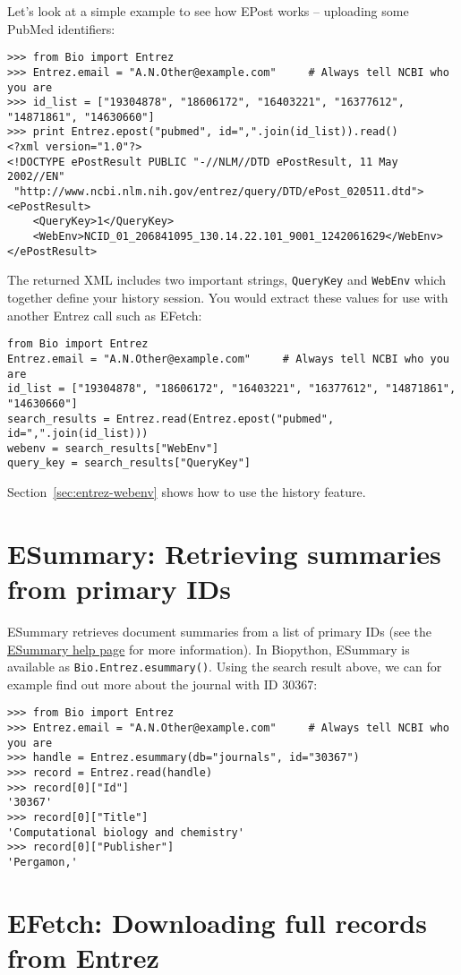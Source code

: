 \documentclass{report}
\begin{document}
Let's look at a simple example to see how EPost works -- uploading some PubMed identifiers:
\begin{verbatim}
>>> from Bio import Entrez
>>> Entrez.email = "A.N.Other@example.com"     # Always tell NCBI who you are
>>> id_list = ["19304878", "18606172", "16403221", "16377612", "14871861", "14630660"]
>>> print Entrez.epost("pubmed", id=",".join(id_list)).read()
<?xml version="1.0"?>
<!DOCTYPE ePostResult PUBLIC "-//NLM//DTD ePostResult, 11 May 2002//EN"
 "http://www.ncbi.nlm.nih.gov/entrez/query/DTD/ePost_020511.dtd">
<ePostResult>
	<QueryKey>1</QueryKey>
	<WebEnv>NCID_01_206841095_130.14.22.101_9001_1242061629</WebEnv>
</ePostResult>
\end{verbatim}
\noindent The returned XML includes two important strings, \verb|QueryKey| and \verb|WebEnv| which together define your history session.
You would extract these values for use with another Entrez call such as EFetch:
\begin{verbatim}
from Bio import Entrez
Entrez.email = "A.N.Other@example.com"     # Always tell NCBI who you are
id_list = ["19304878", "18606172", "16403221", "16377612", "14871861", "14630660"]
search_results = Entrez.read(Entrez.epost("pubmed", id=",".join(id_list)))
webenv = search_results["WebEnv"]
query_key = search_results["QueryKey"] 
\end{verbatim}
\noindent Section~\ref{sec:entrez-webenv} shows how to use the history feature.

\section{ESummary: Retrieving summaries from primary IDs}
ESummary retrieves document summaries from a list of primary IDs (see the  \href{http://www.ncbi.nlm.nih.gov/entrez/query/static/esummary\_help.html}{ESummary help page} for more information). In Biopython, ESummary is available as \verb+Bio.Entrez.esummary()+. Using the search result above, we can for example find out more about the journal with ID 30367:
\begin{verbatim}
>>> from Bio import Entrez
>>> Entrez.email = "A.N.Other@example.com"     # Always tell NCBI who you are
>>> handle = Entrez.esummary(db="journals", id="30367")
>>> record = Entrez.read(handle)
>>> record[0]["Id"]
'30367'
>>> record[0]["Title"]
'Computational biology and chemistry'
>>> record[0]["Publisher"]
'Pergamon,'
\end{verbatim}

\section{EFetch: Downloading full records from Entrez}
\label{sec:efetch}
\end{document}
